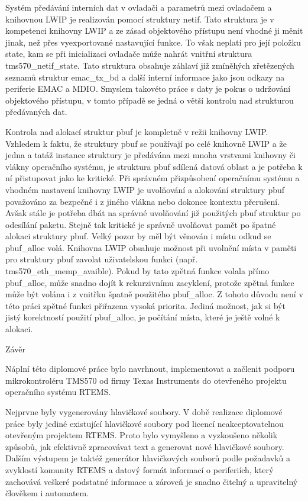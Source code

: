 Systém předávání interních dat v ovladači a parametrů mezi ovladačem a knihovnou LWIP je realizován pomocí struktury netif.
Tato struktura je v kompetenci knihovny LWIP a ze zásad objektového přístupu není vhodné ji měnit jinak, než přes vyexportované nastavující funkce.
To však neplatí pro její položku state, kam se při inicializaci ovladače může nahrát vnitřní struktura tms570\_netif\_state.
Tato struktura obsahuje záhlaví již zmíněhých zřetězených seznamů struktur emac\_tx\_bd a další interní informace jako jsou odkazy na periferie EMAC a MDIO.
Smyslem takovéto práce s daty je pokus o udržování objektového přístupu, v tomto případě se jedná o větší kontrolu nad strukturou předávaných dat.

Kontrola nad alokací struktur pbuf je kompletně v režii knihovny LWIP.
Vzhledem k faktu, že struktury pbuf se používají po celé knihovně LWIP a že jedna a tatáž instance struktury je předávána mezi mnoha vrstvami knihovny či vlákny operačního systému, je struktura pbuf sdílená datová oblast a je potřeba k ní přistupovat jako ke kritické.
Při správném přizpůsobení operačnímu systému a vhodném nastavení knihovny LWIP je uvolňování a alokování struktury pbuf považováno za bezpečné i z jiného vlákna nebo dokonce kontextu přerušení.
Avšak stále je potřeba dbát na správné uvolňování již použitých pbuf struktur po odesílání paketu.
Stejně tak kritické je správně uvolňovat pamět po špatné alokaci struktury pbuf.
Velký pozor by měl být věnován i místu odkud se pbuf\_alloc volá.
Knihovna LWIP obsahuje možnost při uvolnění místa v paměti pro struktury pbuf zavolat uživatelskou funkci (např. tms570\_eth\_memp\_avaible).{}
Pokud by tato zpětná funkce volala přímo pbuf\_alloc, může snadno dojít k rekurzivnímu zacyklení, protože zpětná funkce může být volána i z vnitřku špatně použitého pbuf\_alloc.
Z tohoto důvodu není v této práci zpětné funkci přiřazena vysoká priorita.
Jediná možnost, jak si být jistý korektností použití pbuf\_alloc, je počítání místa, které je ještě volné k alokaci.

\chap Závěr

Náplní této diplomové práce bylo navrhnout, implementovat a začlenit podporu mikrokontroléru TMS570 od firmy Texas Instruments do otevřeného projektu operačního systému RTEMS.

\medskip

Nejprvne byly vygenerovány hlavičkové soubory.
V době realizace diplomové práce byly jediné existující hlavičkové soubory pod licencí neakceptovatelnou otevřeným projektem RTEMS.
Proto bylo vymyšleno a vyzkoušeno několik způsobů, jak efektivně zpracovávat text a generovat nové hlavičkové soubory.
Dalším výstupem je taktéž generátor hlavičkových souborů podle požadavků a zvyklostí komunity RTEMS a datový formát informací o periferiích, který zachovává veškeré podstatné informace a zároveň je snadno čitelný a upravitelný člověkem i automatem.

